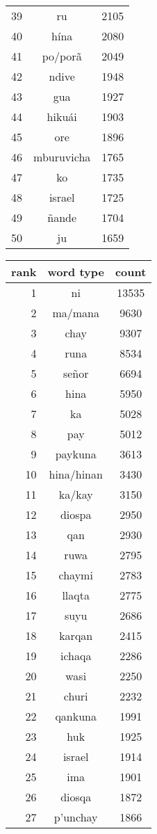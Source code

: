 \begin{figure*}
\begin{tiny}
\begin{centering}
\begin{tabular}{|r|c|c|}
39 & ru & 2105 \\
40 & hína & 2080 \\
41 & po/porã & 2049 \\
42 & ndive & 1948 \\
43 & gua & 1927 \\
44 & hikuái & 1903 \\
45 & ore & 1896 \\
46 & mburuvicha & 1765 \\
47 & ko & 1735 \\
48 & israel & 1725 \\
49 & ñande & 1704 \\
50 & ju & 1659 \\
    \hline
  \end{tabular}
  \quad
  \begin{tabular}{|r|c|c|}
    \hline
    rank & word type & count \\
    \hline
1 & ni & 13535 \\
2 & ma/mana & 9630 \\
3 & chay & 9307 \\
4 & runa & 8534 \\
5 & señor & 6694 \\
6 & hina & 5950 \\
7 & ka & 5028 \\
8 & pay & 5012 \\
9 & paykuna & 3613 \\
10 & hina/hinan & 3430 \\
11 & ka/kay & 3150 \\
12 & diospa & 2950 \\
13 & qan & 2930 \\
14 & ruwa & 2795 \\
15 & chaymi & 2783 \\
16 & llaqta & 2775 \\
17 & suyu & 2686 \\
18 & karqan & 2415 \\
19 & ichaqa & 2286 \\
20 & wasi & 2250 \\
21 & churi & 2232 \\
22 & qankuna & 1991 \\
23 & huk & 1925 \\
24 & israel & 1914 \\
25 & ima & 1901 \\
26 & diosqa & 1872 \\
27 & p'unchay & 1866 \\

\end{tabular}
\end{centering}
\end{tiny}
\end{figure*}
